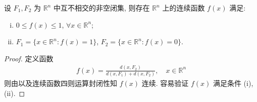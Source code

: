 \documentclass[../../main.tex]{subfiles}
\begin{document}
\begin{proposition}
设 $F_1, F_2$ 为 $\mathbb{R}^n$ 中互不相交的非空闭集, 则存在 $\mathbb{R}^n$ 上的连续函数 $f(x)$ 满足:
\begin{enumerate}[(i)]
\item $0 \leqslant f(x) \leqslant 1$, $\forall x \in \mathbb{R}^n$;
\item $F_1 = \{x \in \mathbb{R}^n : f(x) = 1\}$, $F_2 = \{x \in \mathbb{R}^n : f(x) = 0\}$.
\end{enumerate}
\end{proposition}
\begin{proof}
定义函数
\begin{align*}
f(x) = \frac{d(x, F_2)}{d(x, F_1) + d(x, F_2)}, \quad x \in \mathbb{R}^n
\end{align*}
则由以及连续函数四则运算封闭性知 $f(x)$ 连续. 容易验证 $f(x)$ 满足条件 (i), (ii).

\end{proof}
  
\end{document}
